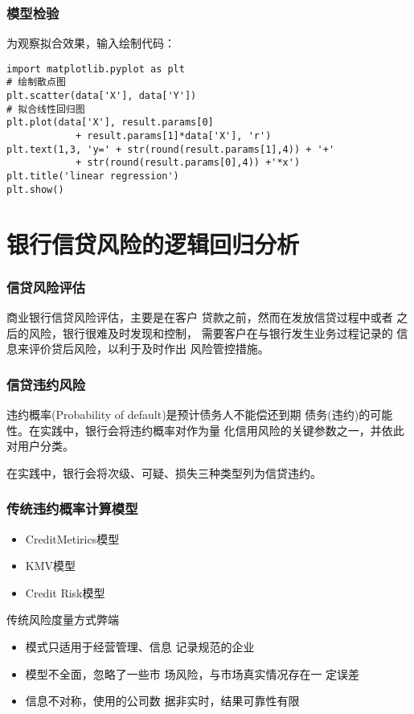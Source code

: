 \documentclass[t]{beamer}
\begin{document}
\begin{frame}[fragile]
  \frametitle{模型检验}
  为观察拟合效果，输入绘制代码：
\begin{lstlisting}
import matplotlib.pyplot as plt 
# 绘制散点图
plt.scatter(data['X'], data['Y'])
# 拟合线性回归图
plt.plot(data['X'], result.params[0] 
            + result.params[1]*data['X'], 'r') 
plt.text(1,3, 'y=' + str(round(result.params[1],4)) + '+'
            + str(round(result.params[0],4)) +'*x') 
plt.title('linear regression')
plt.show()
\end{lstlisting}

\end{frame}

\section{银行信贷风险的逻辑回归分析}
\begin{frame}[fragile]
  \frametitle{信贷风险评估}
商业银行信贷风险评估，主要是在客户
贷款之前，然而在发放信贷过程中或者
之后的风险，银行很难及时发现和控制，
需要客户在与银行发生业务过程记录的
信息来评价贷后风险，以利于及时作出
风险管控措施。
  

\end{frame}

\begin{frame}[fragile]
  \frametitle{信贷违约风险}
违约概率(Probability of default)是预计债务人不能偿还到期
债务(违约)的可能性。在实践中，银行会将违约概率对作为量
化信用风险的关键参数之一，并依此对用户分类。

在实践中，银行会将次级、可疑、损失三种类型列为信贷违约。
\end{frame}


\begin{frame}[fragile]
  \frametitle{传统违约概率计算模型}
\begin{itemize}
  \item CreditMetirics模型
  \item KMV模型
  \item Credit Risk模型
\end{itemize}
\begin{block}{传统风险度量方式弊端}
\begin{itemize}
  \item 模式只适用于经营管理、信息
记录规范的企业
\item 模型不全面，忽略了一些市
场风险，与市场真实情况存在一
定误差
\item 信息不对称，使用的公司数
据非实时，结果可靠性有限
\end{itemize}
\end{block}

\end{frame}
\end{document}
